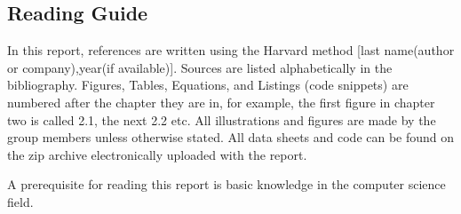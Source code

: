 \subsection*{Reading Guide}
\label{sub:reading_guide}

In this report, references are written using the Harvard method [last name(author or company),year(if available)].
Sources are listed alphabetically in the bibliography.
Figures, Tables, Equations, and Listings (code snippets) are numbered after the chapter they are in,
for example, the first figure in chapter two is called 2.1, the next 2.2 etc.
All illustrations and figures are made by the group members unless otherwise stated.
All data sheets and code can be found on the zip archive electronically uploaded with the report.

A prerequisite for reading this report is basic knowledge in the
computer science field.

